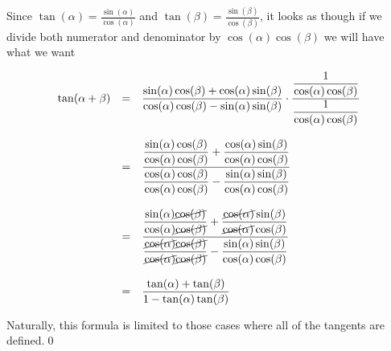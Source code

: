 \documentclass{ximera}
\begin{document}
\begin{example}
\begin{enumerate}
Since  $\tan(\alpha) = \frac{\sin(\alpha)}{\cos(\alpha)}$ and $\tan(\beta) = \frac{\sin(\beta)}{\cos(\beta)}$, it looks as though if we divide both numerator and denominator by $\cos(\alpha) \cos(\beta)$ we will have what we want

\vspace{-.1in}

\[ \begin{array}{rcl}

\tan(\alpha + \beta) & = & \dfrac{\sin(\alpha) \cos(\beta) + \cos(\alpha) \sin(\beta)}{\cos(\alpha) \cos(\beta) - \sin(\alpha) \sin(\beta)} \cdot\dfrac{\dfrac{1}{\cos(\alpha) \cos(\beta)}}{\dfrac{1}{\cos(\alpha) \cos(\beta)}}\\
                    &   & \\
 										& = & \dfrac{\dfrac{\sin(\alpha) \cos(\beta)}{\cos(\alpha) \cos(\beta)} + \dfrac{\cos(\alpha) \sin(\beta)}{\cos(\alpha) \cos(\beta)}}{\dfrac{\cos(\alpha) \cos(\beta)}{\cos(\alpha) \cos(\beta)} - \dfrac{\sin(\alpha) \sin(\beta)}{\cos(\alpha) \cos(\beta)}}\\
                    &   & \\
										& = & \dfrac{\dfrac{\sin(\alpha) \cancel{\cos(\beta)}}{\cos(\alpha) \cancel{\cos(\beta)}} + \dfrac{\cancel{\cos(\alpha)} \sin(\beta)}{\cancel{\cos(\alpha)} \cos(\beta)}}{\dfrac{\cancel{\cos(\alpha)} \cancel{\cos(\beta)}}{\cancel{\cos(\alpha)} \cancel{\cos(\beta)}} - \dfrac{\sin(\alpha) \sin(\beta)}{\cos(\alpha) \cos(\beta)}}\\
                    &   & \\
										& = & \dfrac{\tan(\alpha) + \tan(\beta)}{1 -\tan(\alpha) \tan(\beta)}\\
\end{array} \]

Naturally, this formula is limited to those cases where all of the tangents are defined.\qed

\end{enumerate}

\end{example}
\end{document}

